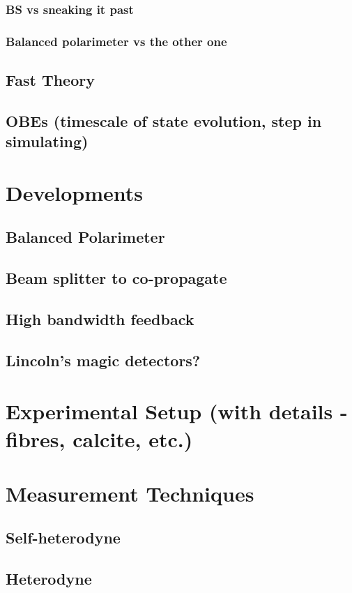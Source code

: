 \subsubsection{BS vs sneaking it past}
\subsubsection{Balanced polarimeter vs the other one}

\subsection{Fast Theory}
\subsection{OBEs (timescale of state evolution, step in simulating)}
\section{Developments}
\subsection{Balanced Polarimeter}
\subsection{Beam splitter to co-propagate}
\subsection{High bandwidth feedback}
\subsection{Lincoln's magic detectors?}
\section{Experimental Setup (with details - fibres, calcite, etc.)}
\section{Measurement Techniques}
\subsection{Self-heterodyne}
\subsection{Heterodyne}
